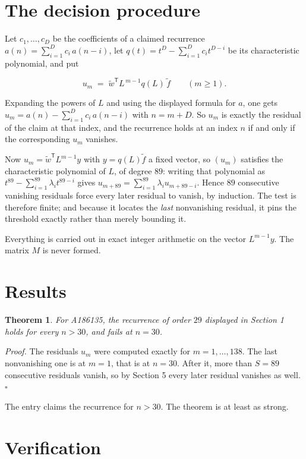 \documentclass[11pt]{article}
\newtheorem{theorem}{Theorem}
\theoremstyle{definition}
\begin{document}
\section{The decision procedure}

Let $c_1,\dots,c_D$ be the coefficients of a claimed recurrence $a(n) = \sum_{i=1}^{D} c_i\,a(n-i)$, let $q(t) = t^{D} - \sum_{i=1}^{D} c_i t^{D-i}$ be its characteristic polynomial, and put

\[u_m \;=\; \tilde w^{\mathsf T} L^{\,m-1} q(L)\,\tilde f \qquad (m \ge 1).\]

Expanding the powers of $L$ and using the displayed formula for $a$, one gets $u_m = a(n) - \sum_{i=1}^{D} c_i\,a(n-i)$ with $n = m + D$. So $u_m$ is exactly the residual of the claim at that index, and the recurrence holds at an index $n$ if and only if the corresponding $u_m$ vanishes.

Now $u_m = \tilde w^{\mathsf T} L^{m-1} y$ with $y = q(L)\tilde f$ a fixed vector, so $(u_m)$ satisfies the characteristic polynomial of $L$, of degree $89$: writing that polynomial as $t^{89} - \sum_{i=1}^{89} \lambda_i t^{89-i}$ gives $u_{m+89} = \sum_{i=1}^{89} \lambda_i u_{m+89-i}$. Hence $89$ consecutive vanishing residuals force every later residual to vanish, by induction. The test is therefore finite; and because it locates the {\itshape last} nonvanishing residual, it pins the threshold exactly rather than merely bounding it.

Everything is carried out in exact integer arithmetic on the vector $L^{m-1}y$. The matrix $M$ is never formed.

\section{Results}

\begin{theorem} For A186135, the recurrence of order $29$ displayed in Section 1 holds for every $n > 30$, and fails at $n = 30$.\end{theorem}

{\itshape Proof.} The residuals $u_m$ were computed exactly for $m = 1,\dots,138$. The last nonvanishing one is at $m = 1$, that is at $n = 30$. After it, more than $S = 89$ consecutive residuals vanish, so by Section 5 every later residual vanishes as well. $\square$

The entry claims the recurrence for $n > 30$. The theorem is at least as strong.

\section{Verification}
\end{document}
